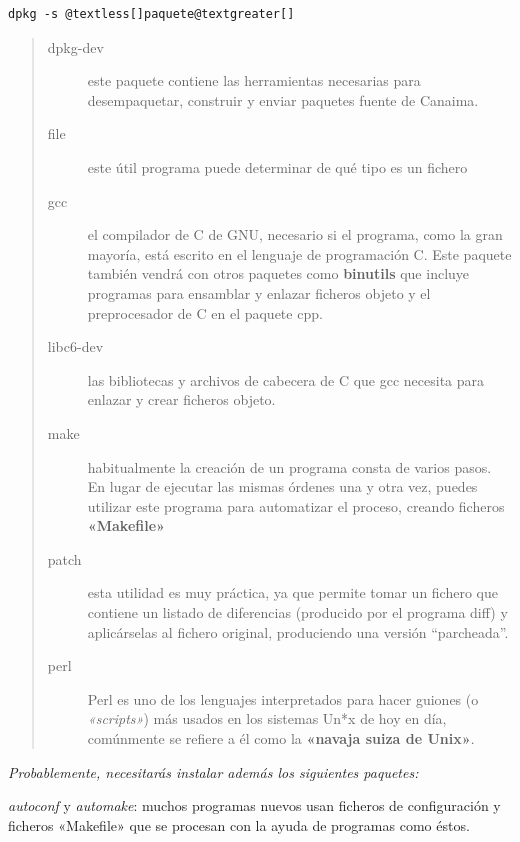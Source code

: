 \documentclass[letterpaper,12pt,spanish]{manual}
\begin{document}
\begin{Verbatim}[commandchars=@\[\]]
dpkg -s @textless[]paquete@textgreater[]
\end{Verbatim}
\begin{quote}\begin{description}
\item[{dpkg-dev}] \leavevmode
este paquete contiene las herramientas necesarias para desempaquetar, construir y enviar paquetes fuente de Canaima.

\item[{file}] \leavevmode
este útil programa puede determinar de qué tipo es un fichero

\item[{gcc}] \leavevmode
el compilador de C de GNU, necesario si el programa, como la gran mayoría, está escrito en el lenguaje de programación C. Este paquete también vendrá con otros paquetes como \textbf{binutils} que incluye programas para ensamblar y enlazar ficheros objeto y el preprocesador de C en el paquete cpp.

\item[{libc6-dev}] \leavevmode
las bibliotecas y archivos de cabecera de C que gcc necesita para enlazar y crear ficheros objeto.

\item[{make}] \leavevmode
habitualmente la creación de un programa consta de varios pasos. En lugar de ejecutar las mismas órdenes una y otra vez, puedes utilizar este programa para automatizar el proceso, creando ficheros \textbf{«Makefile»}

\item[{patch}] \leavevmode
esta utilidad es muy práctica, ya que permite tomar un fichero que contiene un listado de diferencias (producido por el programa diff) y aplicárselas al fichero original, produciendo una versión ``parcheada''.

\item[{perl}] \leavevmode
Perl es uno de los lenguajes interpretados para hacer guiones (o \emph{«scripts»}) más usados en los sistemas Un*x de hoy en día, comúnmente se refiere a él como la \textbf{«navaja suiza de Unix»}.

\end{description}\end{quote}

\emph{Probablemente, necesitarás instalar además los siguientes paquetes:}

\emph{autoconf} y \emph{automake}: muchos programas nuevos usan ficheros de configuración y ficheros «Makefile» que se procesan con la ayuda de programas como éstos.
\end{document}

